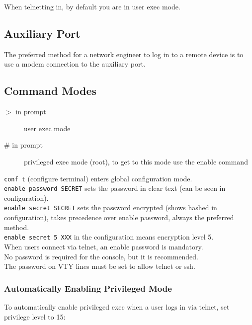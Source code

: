 When telnetting in, by default you are in user exec mode.

\subsection{Auxiliary Port}

The preferred method for a network engineer to log in to a remote device is
to use a modem connection to the auxiliary port.

\subsection{Command Modes}

\begin{description}

\item[$>$ in prompt]
user exec mode

\item[\# in prompt]
privileged exec mode (root), to get to this mode use the enable command

\end{description}

\texttt{conf t} (configure terminal) enters global configuration mode.\\

\texttt{enable password SECRET} sets the password in clear text (can be seen
in configuration).\\

\texttt{enable secret SECRET} sets the password encrypted (shows hashed in
configuration), takes precedence over enable password, always the preferred
method.\\

\texttt{enable secret 5 XXX} in the configuration means encryption level 5.\\

When users connect via telnet, an enable password is mandatory.\\

No password is required for the console, but it is recommended.\\

The password on VTY lines must be set to allow telnet or ssh.

\subsubsection{Automatically Enabling Privileged Mode}

To automatically enable privileged exec when a user logs in via telnet, set
privilege level to 15:

